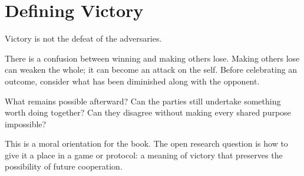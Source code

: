 \chapter{Defining Victory}
\label{short:defining-victory}

Victory is not the defeat of the adversaries.

There is a confusion between winning and making others lose. Making others
lose can weaken the whole; it can become an attack on the self. Before
celebrating an outcome, consider what has been diminished along with the
opponent.

What remains possible afterward? Can the parties still undertake something
worth doing together? Can they disagree without making every shared purpose
impossible?

This is a moral orientation for the book. The open research question is how
to give it a place in a game or protocol: a meaning of victory that preserves
the possibility of future cooperation.

